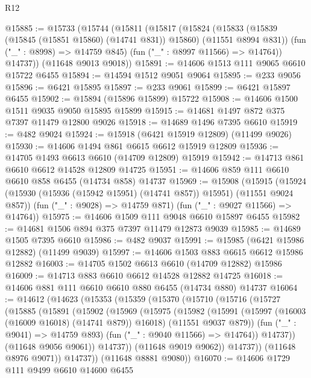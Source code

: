 \begin{lexlean}{R12}
\begin{coremodule}
@15885 := @15733
    (@15744
      (@15811
        (@15817
          (@15824
            (@15833 (@15839 (@15845 (@15851 @15860) (@14741 @831)) @15860) (@11551 @8994 @831))
            (fun ("_" : @8998) => @14759 @845)
            (fun ("_" : @8997 @11566) => @14764))
          @14737))
      (@11648 @9013 @9018))
@15891 := @14606 @1513 @111 @9065 @6610 @15722 @6455
@15894 := @14594 @1512 @9051 @9064
@15895 := @233 @9056
@15896 := @6421 @15895
@15897 := @233 @9061
@15899 := @6421 @15897 @6455
@15902 := @15894 (@15896 @15899) @15722
@15908 := @14606 @1500 @1511 @9035 @9050 @15895 @15899
@15915 := @14681 @1497 @872 @375 @7397 @11479 @12800 @9026
@15918 := @14689 @1496 @7395 @6610
@15919 := @482 @9024
@15924 := @15918 (@6421 @15919 @12809) (@11499 @9026)
@15930 := @14606 @1494 @861 @6615 @6612 @15919 @12809
@15936 := @14705 @1493 @6613 @6610 (@14709 @12809) @15919
@15942 := @14713 @861 @6610 @6612 @14528 @12809 @14725
@15951 := @14606 @859 @111 @6610 @6610 @858 @6455 (@14734 @858) @14737
@15969 := @15908
    (@15915
      (@15924 (@15930 (@15936 (@15942 @15951) (@14741 @857)) @15951) (@11551 @9024 @857))
      (fun ("_" : @9028) => @14759 @871)
      (fun ("_" : @9027 @11566) => @14764))
@15975 := @14606 @1509 @111 @9048 @6610 @15897 @6455
@15982 := @14681 @1506 @894 @375 @7397 @11479 @12873 @9039
@15985 := @14689 @1505 @7395 @6610
@15986 := @482 @9037
@15991 := @15985 (@6421 @15986 @12882) (@11499 @9039)
@15997 := @14606 @1503 @883 @6615 @6612 @15986 @12882
@16003 := @14705 @1502 @6613 @6610 (@14709 @12882) @15986
@16009 := @14713 @883 @6610 @6612 @14528 @12882 @14725
@16018 := @14606 @881 @111 @6610 @6610 @880 @6455 (@14734 @880) @14737
@16064 := @14612
    (@14623
      (@15353
        (@15359
          (@15370
            (@15710
              (@15716
                (@15727
                  (@15885
                    (@15891
                      (@15902
                        (@15969
                          (@15975
                            (@15982
                              (@15991
                                (@15997 (@16003 (@16009 @16018) (@14741 @879)) @16018)
                                (@11551 @9037 @879))
                              (fun ("_" : @9041) => @14759 @893)
                              (fun ("_" : @9040 @11566) => @14764))
                            @14737))
                        (@11648 @9056 @9061))
                      @14737))
                  (@11648 @9019 @9062))
                @14737))
            (@11648 @8976 @9071))
          @14737))
      (@11648 @8881 @9080))
@16070 := @14606 @1729 @111 @9499 @6610 @14600 @6455

\end{coremodule}
\end{lexlean}
